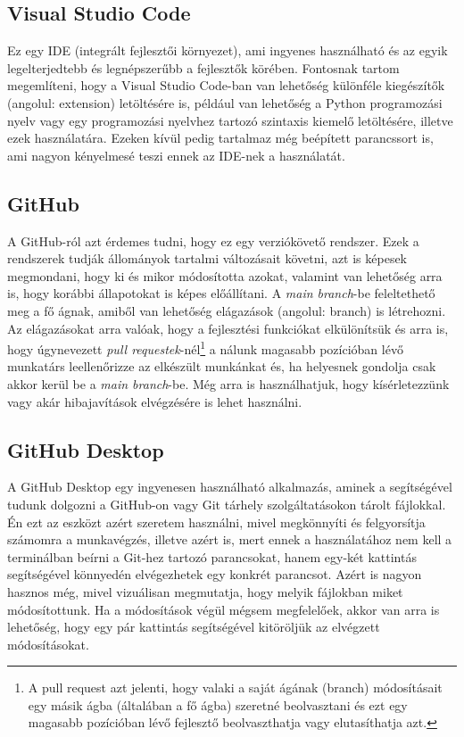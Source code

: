 \documentclass[]{thesis-ekf}
\theoremstyle{definition}
\theoremstyle{remark}
\begin{document}
	\subsection{Visual Studio Code}
		Ez egy IDE (integrált fejlesztői környezet), ami ingyenes használható és az egyik legelterjedtebb és legnépszerűbb a fejlesztők körében. Fontosnak tartom megemlíteni, hogy a Visual Studio Code-ban van lehetőség különféle kiegészítők (angolul: extension) letöltésére is, például van lehetőség a Python programozási nyelv vagy egy programozási nyelvhez tartozó szintaxis kiemelő letöltésére, illetve ezek használatára. Ezeken kívül pedig tartalmaz még beépített parancssort is, ami nagyon kényelmesé teszi ennek az IDE-nek a használatát. 
	\subsection{GitHub}
		A GitHub-ról azt érdemes tudni, hogy ez egy verziókövető rendszer. Ezek a rendszerek tudják állományok tartalmi változásait követni, azt is képesek megmondani, hogy ki és mikor módosította azokat, valamint van lehetőség arra is, hogy korábbi állapotokat is képes előállítani. A \emph{main branch}-be feleltethető meg a fő ágnak, amiből van lehetőség elágazások (angolul: branch) is létrehozni. Az elágazásokat arra valóak, hogy a fejlesztési funkciókat elkülönítsük és arra is, hogy úgynevezett \emph{pull requestek}-nél\footnote{A pull request azt jelenti, hogy valaki a saját ágának (branch) módosításait egy másik ágba (általában a fő ágba) szeretné beolvasztani és ezt egy magasabb pozícióban lévő fejlesztő beolvaszthatja vagy elutasíthatja azt.} a nálunk magasabb pozícióban lévő munkatárs leellenőrizze az elkészült munkánkat és, ha helyesnek gondolja csak akkor kerül be a \emph{main branch}-be. Még arra is használhatjuk, hogy kísérletezzünk vagy akár hibajavítások elvégzésére is lehet használni.
	\subsection{GitHub Desktop}
		A GitHub Desktop egy ingyenesen használható alkalmazás, aminek a segítségével tudunk dolgozni a GitHub-on vagy Git tárhely szolgáltatásokon tárolt fájlokkal. Én ezt az eszközt azért szeretem használni, mivel megkönnyíti és felgyorsítja számomra a munkavégzés, illetve azért is, mert ennek a használatához nem kell a terminálban beírni a Git-hez tartozó parancsokat, hanem egy-két kattintás segítségével könnyedén elvégezhetek egy konkrét parancsot. Azért is nagyon hasznos még, mivel vizuálisan megmutatja, hogy melyik fájlokban miket módosítottunk. Ha a módosítások végül mégsem megfelelőek, akkor van arra is lehetőség, hogy egy pár kattintás segítségével kitöröljük az elvégzett módosításokat. \cite{GitHubDesktop}
\end{document}

